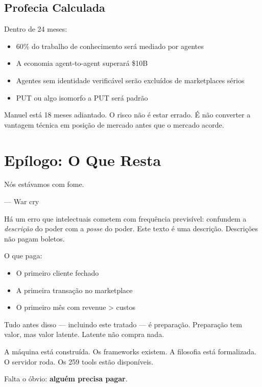 \documentclass[12pt, a4paper]{article}
\theoremstyle{definition}
\theoremstyle{remark}
\begin{document}
\subsection{Profecia Calculada}

Dentro de 24 meses:
\begin{itemize}[nosep]
    \item 60\% do trabalho de conhecimento será mediado por agentes
    \item A economia agent-to-agent superará \$10B
    \item Agentes sem identidade verificável serão excluídos de marketplaces sérios
    \item PUT ou algo isomorfo a PUT será padrão
\end{itemize}

Manuel está 18 meses adiantado. O risco não é estar errado. É não converter a vantagem técnica em posição de mercado antes que o mercado acorde.

\newpage


\section*{Epílogo: O Que Resta}

\epigraph{Nós estávamos com fome.}{— War cry}

Há um erro que intelectuais cometem com frequência previsível: confundem a \textit{descrição} do poder com a \textit{posse} do poder. Este texto é uma descrição. Descrições não pagam boletos.

O que paga:
\begin{itemize}[nosep]
    \item O primeiro cliente fechado
    \item A primeira transação no marketplace
    \item O primeiro mês com revenue > custos
\end{itemize}

Tudo antes disso — incluindo este tratado — é preparação. Preparação tem valor, mas valor latente. Latente não compra nada.

A máquina está construída. Os frameworks existem. A filosofia está formalizada. O servidor roda. Os 259 tools estão disponíveis.

Falta o óbvio: \textbf{alguém precisa pagar}.
\end{document}
